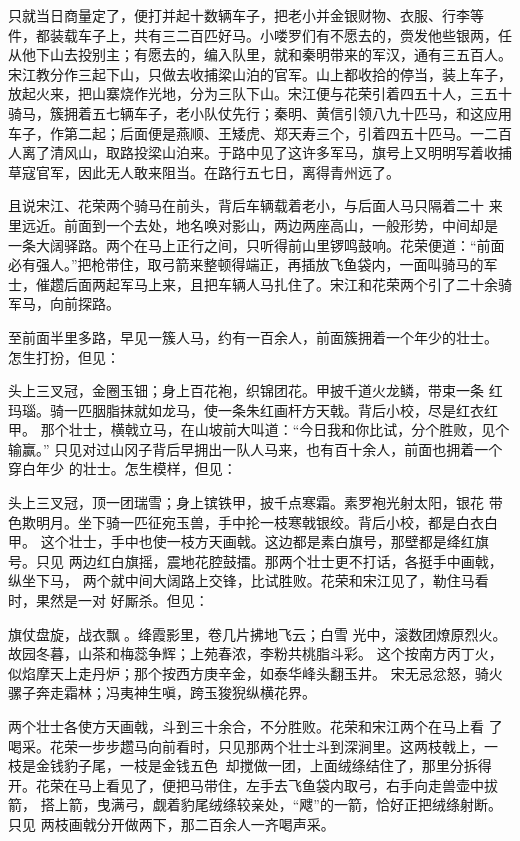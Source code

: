 只就当日商量定了，便打并起十数辆车子，把老小并金银财物、衣服、行李等
件，都装载车子上，共有三二百匹好马。小喽罗们有不愿去的，赍发他些银两，任
从他下山去投别主；有愿去的，编入队里，就和秦明带来的军汉，通有三五百人。
宋江教分作三起下山，只做去收捕梁山泊的官军。山上都收拾的停当，装上车子，
放起火来，把山寨烧作光地，分为三队下山。宋江便与花荣引着四五十人，三五十
骑马，簇拥着五七辆车子，老小队仗先行；秦明、黄信引领八九十匹马，和这应用
车子，作第二起；后面便是燕顺、王矮虎、郑天寿三个，引着四五十匹马。一二百
人离了清风山，取路投梁山泊来。于路中见了这许多军马，旗号上又明明写着收捕
草寇官军，因此无人敢来阻当。在路行五七日，离得青州远了。

且说宋江、花荣两个骑马在前头，背后车辆载着老小，与后面人马只隔着二十
来里远近。前面到一个去处，地名唤对影山，两边两座高山，一般形势，中间却是
一条大阔驿路。两个在马上正行之间，只听得前山里锣鸣鼓响。花荣便道：“前面
必有强人。”把枪带住，取弓箭来整顿得端正，再插放飞鱼袋内，一面叫骑马的军
士，催趱后面两起军马上来，且把车辆人马扎住了。宋江和花荣两个引了二十余骑
军马，向前探路。

至前面半里多路，早见一簇人马，约有一百余人，前面簇拥着一个年少的壮士。
怎生打扮，但见：

头上三叉冠，金圈玉钿；身上百花袍，织锦团花。甲披千道火龙鳞，带束一条
红玛瑙。骑一匹胭脂抹就如龙马，使一条朱红画杆方天戟。背后小校，尽是红衣红
甲。
那个壮士，横戟立马，在山坡前大叫道：“今日我和你比试，分个胜败，见个输赢。”
只见对过山冈子背后早拥出一队人马来，也有百十余人，前面也拥着一个穿白年少
的壮士。怎生模样，但见：

头上三叉冠，顶一团瑞雪；身上镔铁甲，披千点寒霜。素罗袍光射太阳，银花
带色欺明月。坐下骑一匹征宛玉兽，手中抡一枝寒戟银绞。背后小校，都是白衣白
甲。
这个壮士，手中也使一枝方天画戟。这边都是素白旗号，那壁都是绛红旗号。只见
两边红白旗摇，震地花腔鼓擂。那两个壮士更不打话，各挺手中画戟，纵坐下马，
两个就中间大阔路上交锋，比试胜败。花荣和宋江见了，勒住马看时，果然是一对
好厮杀。但见：

旗仗盘旋，战衣飘。绛霞影里，卷几片拂地飞云；白雪
光中，滚数团燎原烈火。故园冬暮，山茶和梅蕊争辉；上苑春浓，李粉共桃脂斗彩。
这个按南方丙丁火，似焰摩天上走丹炉；那个按西方庚辛金，如泰华峰头翻玉井。
宋无忌忿怒，骑火骡子奔走霜林；冯夷神生嗔，跨玉狻猊纵横花界。

两个壮士各使方天画戟，斗到三十余合，不分胜败。花荣和宋江两个在马上看
了喝采。花荣一步步趱马向前看时，只见那两个壮士斗到深涧里。这两枝戟上，一
枝是金钱豹子尾，一枝是金钱五色，却搅做一团，上面绒绦结住了，那里分拆得
开。花荣在马上看见了，便把马带住，左手去飞鱼袋内取弓，右手向走兽壶中拔箭，
搭上箭，曳满弓，觑着豹尾绒绦较亲处，“飕”的一箭，恰好正把绒绦射断。只见
两枝画戟分开做两下，那二百余人一齐喝声采。

